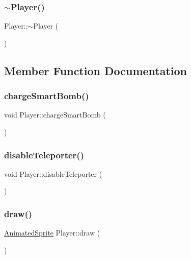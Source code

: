 \mbox{\label{class_player_a749d2c00e1fe0f5c2746f7505a58c062}} 
\subsubsection{\texorpdfstring{$\sim$\+Player()}{~Player()}}
{\footnotesize\ttfamily Player\+::$\sim$\+Player (\begin{DoxyParamCaption}{ }\end{DoxyParamCaption})}



\subsection{Member Function Documentation}
\mbox{\label{class_player_a2c704d0bed9de1dc0b3512113f42bb97}} 
\subsubsection{\texorpdfstring{charge\+Smart\+Bomb()}{chargeSmartBomb()}}
{\footnotesize\ttfamily void Player\+::charge\+Smart\+Bomb (\begin{DoxyParamCaption}{ }\end{DoxyParamCaption})}

\mbox{\label{class_player_a805a8d4ae2c5eddaee1ff7c716467f2c}} 
\subsubsection{\texorpdfstring{disable\+Teleporter()}{disableTeleporter()}}
{\footnotesize\ttfamily void Player\+::disable\+Teleporter (\begin{DoxyParamCaption}{ }\end{DoxyParamCaption})}

\mbox{\label{class_player_af9e361fd707a32d86ff1a0f75fb2c3b2}} 
\subsubsection{\texorpdfstring{draw()}{draw()}}
{\footnotesize\ttfamily \hyperlink{class_animated_sprite}{Animated\+Sprite} Player\+::draw (\begin{DoxyParamCaption}{ }\end{DoxyParamCaption})}

